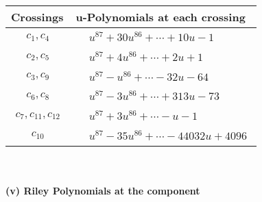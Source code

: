 \documentclass[1p]{elsarticle_modified}
\theoremstyle{definition}
\begin{document}
\begin{tabular}{m{50pt}|m{274pt}}
Crossings & \hspace{64pt}u-Polynomials at each crossing \\
\hline $$\begin{aligned}c_{1},c_{4}\end{aligned}$$&$\begin{aligned}
&u^{87}+30 u^{86}+\cdots+10 u-1
\end{aligned}$\\
\hline $$\begin{aligned}c_{2},c_{5}\end{aligned}$$&$\begin{aligned}
&u^{87}+4 u^{86}+\cdots+2 u+1
\end{aligned}$\\
\hline $$\begin{aligned}c_{3},c_{9}\end{aligned}$$&$\begin{aligned}
&u^{87}- u^{86}+\cdots-32 u-64
\end{aligned}$\\
\hline $$\begin{aligned}c_{6},c_{8}\end{aligned}$$&$\begin{aligned}
&u^{87}-3 u^{86}+\cdots+313 u-73
\end{aligned}$\\
\hline $$\begin{aligned}c_{7},c_{11},c_{12}\end{aligned}$$&$\begin{aligned}
&u^{87}+3 u^{86}+\cdots- u-1
\end{aligned}$\\
\hline $$\begin{aligned}c_{10}\end{aligned}$$&$\begin{aligned}
&u^{87}-35 u^{86}+\cdots-44032 u+4096
\end{aligned}$\\
\hline
\end{tabular}\\~\\
\newpage\renewcommand{\arraystretch}{1}
\flushleft \textbf{(v) Riley Polynomials at the component}\newline \\
\end{document}
